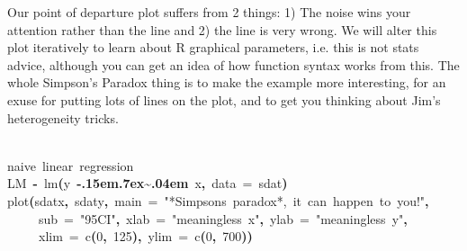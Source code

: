 \documentclass[a4paper]{article}
\newcommand{\hlnumber}[1]{\textcolor[rgb]{0.0823529411764706,0.0784313725490196,0.709803921568627}{#1}}%
\newcommand{\hlfunctioncall}[1]{\textcolor[rgb]{1,0,0}{#1}}%
\newcommand{\hlstring}[1]{\textcolor[rgb]{0.6,0.6,1}{#1}}%
\newcommand{\hlkeyword}[1]{\textcolor[rgb]{0,0,0}{\textbf{#1}}}%
\newcommand{\hlargument}[1]{\textcolor[rgb]{0.694117647058824,0.247058823529412,0.0196078431372549}{#1}}%
\newcommand{\hlcomment}[1]{\textcolor[rgb]{0.8,0.8,0.8}{#1}}%
\newcommand{\hlassignement}[1]{\textcolor[rgb]{0.215686274509804,0.215686274509804,0.384313725490196}{\textbf{#1}}}%
\newcommand{\hlsymbol}[1]{\textcolor[rgb]{0,0,0}{#1}}%
\newcommand{\hlprompt}[1]{\textcolor[rgb]{0,0,0}{#1}}%
\def\urltilda{\kern -.15em\lower .7ex\hbox{\~{}}\kern .04em}%
\newcommand{\hlstd}[1]{\textcolor[rgb]{0,0,0}{#1}}%
\newenvironment{Houtput}{\raggedright}{%
%
}
\begin{document}
Our point of departure plot suffers from 2 things: 1) The noise wins your attention rather than the line and 2) the line is very wrong. We will alter this plot iteratively to learn about R graphical parameters, i.e. this is not stats advice, although you can get an idea of how function syntax works from this. The whole Simpson's Paradox thing is to make the example more interesting, for an exuse for putting lots of lines on the plot, and to get you thinking about Jim's heterogeneity tricks.

\begin{Houtput}
\hspace*{\fill}\\
\hlstd{}\ttfamily\noindent
\hlprompt{\usebox{\hlnormalsizeboxgreaterthan}{\ }}\hlcomment{\usebox{\hlnormalsizeboxhash}{\ }naive{\ }linear{\ }regression}\mbox{}
\normalfont
\hspace*{\fill}\\
\hlstd{}\ttfamily\noindent
\hlprompt{\usebox{\hlnormalsizeboxgreaterthan}{\ }}\hlsymbol{LM}{\ }\hlassignement{\usebox{\hlnormalsizeboxlessthan}-}{\ }\hlfunctioncall{lm}\hlkeyword{(}\hlsymbol{y}{\ }\hlkeyword{\urltilda{}}{\ }\hlsymbol{x}\hlkeyword{,}{\ }\hlargument{data}{\ }\hlargument{=}{\ }\hlsymbol{sdat}\hlkeyword{)}\mbox{}
\normalfont
\hspace*{\fill}\\
\hlstd{}\ttfamily\noindent
\hlprompt{\usebox{\hlnormalsizeboxgreaterthan}{\ }}\hlfunctioncall{plot}\hlkeyword{(}\hlsymbol{sdat}\hlkeyword{\usebox{\hlnormalsizeboxdollar}}\hlsymbol{x}\hlkeyword{,}{\ }\hlsymbol{sdat}\hlkeyword{\usebox{\hlnormalsizeboxdollar}}\hlsymbol{y}\hlkeyword{,}{\ }\hlargument{main}{\ }\hlargument{=}{\ }\hlstring{"*Simpson\usebox{\hlnormalsizeboxsinglequote}s{\ }paradox*,{\ }it{\ }can{\ }happen{\ }to{\ }you!"}\hlkeyword{,}\hspace*{\fill}\\
\hlstd{}\hlprompt{{\ }}{\ }{\ }{\ }{\ }\hlargument{sub}{\ }\hlargument{=}{\ }\hlstring{"95\usebox{\hlnormalsizeboxpercent}{\ }CI"}\hlkeyword{,}{\ }\hlargument{xlab}{\ }\hlargument{=}{\ }\hlstring{"meaningless{\ }x"}\hlkeyword{,}{\ }\hlargument{ylab}{\ }\hlargument{=}{\ }\hlstring{"meaningless{\ }y"}\hlkeyword{,}\hspace*{\fill}\\
\hlstd{}\hlprompt{{\ }}{\ }{\ }{\ }{\ }\hlargument{xlim}{\ }\hlargument{=}{\ }\hlfunctioncall{c}\hlkeyword{(}\hlnumber{0}\hlkeyword{,}{\ }\hlnumber{125}\hlkeyword{)}\hlkeyword{,}{\ }\hlargument{ylim}{\ }\hlargument{=}{\ }\hlfunctioncall{c}\hlkeyword{(}\hlnumber{0}\hlkeyword{,}{\ }\hlnumber{700}\hlkeyword{)}\hlkeyword{)}\mbox{}

\end{Houtput}
\end{document}
